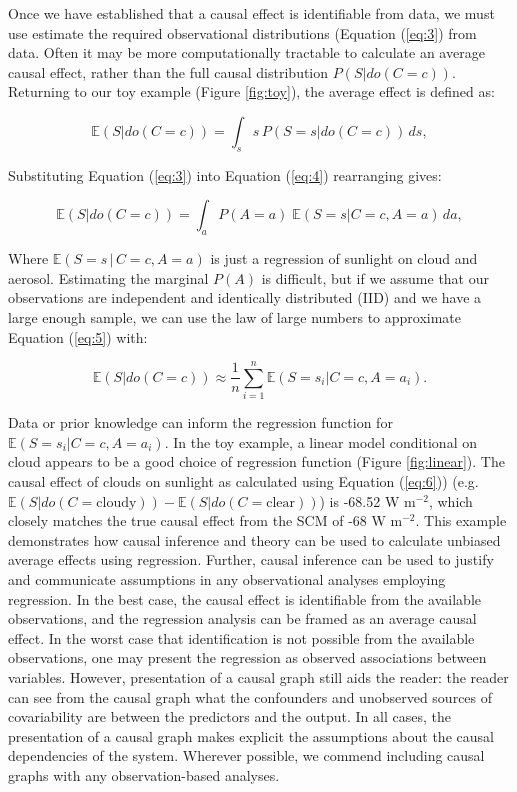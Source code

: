 \documentclass[12pt]{article}
\begin{document}
Once we have established that a causal effect is identifiable from
data, we must use estimate the required observational distributions
(Equation (\ref{eq:3}) from data. Often it may be more computationally
tractable to calculate an average causal effect, rather than the full
causal distribution $P(S | do(C=c))$. Returning to our toy example
(Figure \ref{fig:toy}), the average effect is defined as:

\begin{equation}
  \mathbb{E}(S | do(C = c)) = \int_{s} s \, P(S = s
  | do(C=c)) \, ds,
  \label{eq:4}
\end{equation}

Substituting Equation (\ref{eq:3}) into Equation (\ref{eq:4})
rearranging gives:

\begin{equation}
  \mathbb{E}(S | do(C = c))  = \int_{a} P(A=a) \; \mathbb{E}(S=s |
  C=c, A=a) \, d a,
  \label{eq:5}
\end{equation}

Where $\mathbb{E}(S=s \, | \, C=c, A=a)$ is just a regression of sunlight on
cloud and aerosol. Estimating the marginal $P(A)$ is difficult, but
if we assume that our observations are independent and identically
distributed (IID) and we have a large enough sample, we can use the
law of large numbers to approximate Equation (\ref{eq:5}) with:

\begin{equation}
  \mathbb{E}(S | do(C = c))  \approx \frac{1}{n} \sum_{i=1}^n \mathbb{E}(S=s_i |
  C=c, A=a_i).
  \label{eq:6}
\end{equation}

Data or prior knowledge can inform the regression function for
$\mathbb{E}(S=s_i | C=c, A=a_i)$. In the toy example, a linear model
conditional on cloud appears to be a good choice of regression
function (Figure \ref{fig:linear}). The causal effect of clouds on
sunlight as calculated using Equation (\ref{eq:6})) (e.g.
$\mathbb{E}(S | do(C = \text{cloudy})) - \mathbb{E}(S | do(C =
\text{clear}))$) is -68.52 W m$^{-2}$, which closely matches the true
causal effect from the SCM of -68 W m$^{-2}$. This example
demonstrates how causal inference and theory can be used to calculate
unbiased average effects using regression. Further, causal inference
can be used to justify and communicate assumptions in any
observational analyses employing regression. In the best case, the
causal effect is identifiable from the available observations, and
the regression analysis can be framed as an average causal effect. In
the worst case that identification is not possible from the available
observations, one may present the regression as observed associations
between variables. However, presentation of a causal graph still aids
the reader: the reader can see from the causal graph what the
confounders and unobserved sources of covariability are between the
predictors and the output. In all cases, the presentation of a causal
graph makes explicit the assumptions about the causal dependencies of
the system. Wherever possible, we commend including causal graphs with
any observation-based analyses.
\end{document}
